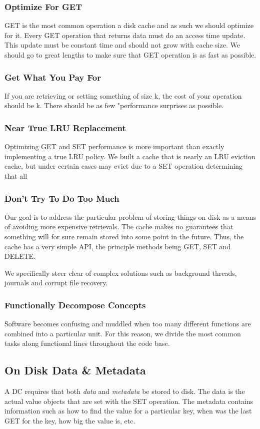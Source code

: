 \documentclass{article}
\begin{document}
\subsubsection{Optimize For GET}
GET is the most common operation a disk cache and as such we should optimize for it. Every GET operation that returns data must do an access time update. This update must be constant time and should not grow with cache size. We should go to great lengths to make sure that GET operation is as fast as possible. 

\subsubsection{Get What You Pay For}
If you are retrieving or setting something of size k, the cost of your operation should be k. There should be as few "performance surprises as possible.

\subsubsection{Near True LRU Replacement}
Optimizing GET and SET performance is more important than exactly implementing a true LRU policy. We built a cache that is nearly an LRU eviction cache, but under certain cases may evict due to a SET operation determining that all 

\subsubsection{Don't Try To Do Too Much}
Our goal is to address the particular problem of storing things on disk as a means of avoiding more expensive retrievals. The cache makes no guarantees that something will for sure remain stored into some point in the future. Thus, the cache has a very simple API, the principle methods being GET, SET and DELETE.

We specifically steer clear of complex solutions such as background threads, journals and corrupt file recovery.

\subsubsection{Functionally Decompose Concepts}
Software becomes confusing and muddled when too many different functions are combined into a particular unit. For this reason, we divide the most common tasks along functional lines throughout the code base.

\subsection{On Disk Data \& Metadata}
A DC requires that both \emph{data} and \emph{metadata} be stored to disk. The data is the actual value objects that are set with the SET operation. The metadata contains information such as how to find the value for a particular key, when was the last GET for the key, how big the value is, etc. 
\end{document}
